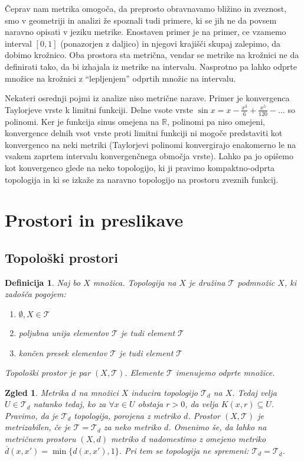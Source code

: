 \documentclass[10pt, a4paper]{article}
\newtheorem{defi}{Definicija}[section]
\newenvironment{noticeB}{%
  \tcolorbox[%
  notitle,
  empty,
  enhanced,  %
  breakable,
  coltext=black,
  colback=white, 
  fontupper=\rmfamily,
  parbox=false,
  noparskip,
  sharp corners,
  boxrule=-1pt,  %
  frame hidden,
  left=7pt,  %
  right=7pt,
  top=5pt,
  bottom=5pt,
  before skip=2.5ex plus 2pt,
  after skip=2.5ex plus 2pt,
  borderline west = {1.5pt}{-0.1pt}{blue!30!black}, %
  overlay unbroken and last={%
    \draw[color=black, line width=1.25pt]
    ($(frame.south west)+(1.pt, -0.1pt)$) -- ++(2em, 0);
  }
  ]}
{\endtcolorbox}
\newenvironment{definicija}{\begin{defi}\begin{noticeB}}{%
    \end{noticeB}\end{defi}}
\newtheorem{zgled}{Zgled}[section]
\newcommand{\R}{\mathbb {R}}
\begin{document}
Čeprav nam metrika omogoča, da preprosto obravnavamo bližino in zveznost, smo v geometriji in analizi 
že spoznali tudi primere, ki se jih ne da povsem naravno opisati v jeziku metrike.
Enostaven primer je na primer, ce vzamemo interval $[0, 1]$ (ponazorjen z daljico)
in njegovi krajišči skupaj zalepimo, da dobimo krožnico.
Oba prostora sta metrična, vendar se metrike na krožnici ne da definirati tako, da bi izhajala iz metrike na intervalu.
Nasprotno pa lahko odprte množice na krožnici z "`lepljenjem"' odprtih množic na intervalu.

Nekateri osrednji pojmi iz analize niso metrične narave. Primer je konvergenca Taylorjeve vrste k limitni funkciji.
Delne vsote vrste $\sin x = x - \frac{x^3}{6} + \frac{x^5}{120} - \dots$ so polinomi.
Ker je funkcija sinus omejena na $\R$, polinomi pa niso omejeni, konvergence delnih vsot vrste proti limitni funkciji ni mogoče predstaviti
kot konvergenco na neki metriki (Taylorjevi polinomi konvergirajo enakomerno le na vsakem zaprtem intervalu konvergenčnega območja vrste).
Lahko pa jo opišemo kot konvergenco glede na neko topologijo, ki ji pravimo kompaktno-odprta topologija 
in ki se izkaže za naravno topologijo na prostoru zveznih funkcij.

\section{Prostori in preslikave}

\subsection{Topološki prostori}

\begin{definicija}
  Naj bo $X$ množica. Topologija na $X$ je družina $\mathcal{T}$ podmnožic $X$,
  ki zadošča pogojem:
  \begin{enumerate}
    \item $\emptyset, X \in \mathcal{T}$
    \item poljubna unija elementov $\mathcal{T}$ je tudi element $\mathcal{T}$
    \item končen presek elementov $\mathcal{T}$ je tudi element $\mathcal{T}$
  \end{enumerate}
  Topološki prostor je par $(X, \mathcal{T})$. Elemente $\mathcal{T}$ imenujemo odprte množice. 
\end{definicija}

\begin{zgled}
    Metrika $d$ na množici $X$ inducira topologijo $\mathcal{T}_d$ na $X$.
    Tedaj velja $U \in \mathcal{T}_d$ natanko tedaj, ko za $\forall x \in U$
    obstaja $r > 0$, da velja $K(x, r) \subseteq U$.
    Pravimo, da je $\mathcal{T}_d$ topologija, porojena z metriko $d$.
    Prostor $(X, \mathcal{T})$ je metrizabilen, če je $\mathcal{T} = \mathcal{T}_d$ za neko metriko $d$.
    Omenimo še, da lahko na metričnem prostoru $(X, d)$ metriko $d$ nadomestimo z omejeno metriko
    $\overline{d} (x, x') = \min \{d(x, x'), 1\}$. Pri tem se topologija ne spremeni: $\mathcal{T}_d = \mathcal{T}_{\overline{d}}$.
\end{zgled}
\end{document}
